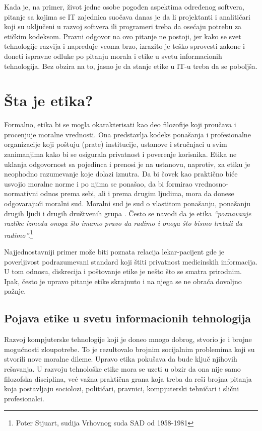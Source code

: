 \documentclass[a4paper]{article}
\begin{document}
{Kada je, na primer, život jedne osobe pogođen aspektima određenog softvera, pitanje sa kojima se IT zajednica suočava danas je da li projektanti i analitičari koji su uključeni u razvoj softvera ili programeri treba da osećaju potrebu za etičkim kodeksom.
Pravni odgovor na ovo pitanje ne postoji, jer kako se svet tehnologije razvija i napreduje veoma brzo, izrazito je teško sprovesti zakone i doneti ispravne odluke po pitanju morala i etike u svetu informacionih tehnologija. Bez obzira na to, jasno je da stanje etike u IT-u treba da se poboljša.

\section{Šta je etika?}

Formalno, etika bi se mogla okarakterisati kao deo filozofije koji pro\-u\-ča\-va i procenjuje moralne vrednosti. Ona predstavlja kodeks ponašanja i profesionalne organizacije koji poštuju (prate) institucije, ustanove i stručnjaci u svim zanimanjima kako bi se osigurala privatnost i poverenje korisnika. Etika ne uklanja odgovornost sa pojedinca i prenosi je na ustanovu, naprotiv, za etiku je neophodno razumevanje koje dolazi iznutra. Da bi čovek kao praktično biće usvojio moralne norme i po njima se ponašao, da bi formirao vrednosno-normativni odnos prema sebi, ali i prema drugim ljudima, mora da donese odgovarajući moralni sud. Moralni sud je sud o vlastitom ponašanju, ponašanju drugih ljudi i drugih društvenih grupa \cite{Tavani}\cite{Illinois}.
Često se navodi da je etika \emph{“poznavanje razlike između onoga što imamo pravo da radimo i onoga što bismo trebali da radimo”.}\footnote{Poter Stjuart, sudija Vrhovnog suda SAD od 1958-1981}

Najjednostavniji primer može biti poznata relacija lekar-pacijent gde je poverljivost podrazumevani standard koji štiti privatnost medicinskih informacija. U tom odnosu, diskrecija i poštovanje etike je nešto što se smatra prirodnim. Ipak, često je upravo pitanje etike skrajnuto i na njega se ne obraća dovoljno pažnje.

\subsection{Pojava etike u svetu informacionih tehnologija}

Razvoj kompjuterske tehnologije koji je doneo mnogo dobrog, stvorio je i brojne mogućnosti zloupotrebe. To je rezultovalo brojnim socijalnim problemima koji su stvorili nove moralne dileme. Upravo  etika pokušava da bude ključ njihovih rešavanja. U razvoju tehnološke etike mora se uzeti u obzir da ona nije samo filozofska disciplina, već važna praktična grana koja treba da reši brojna pitanja koja postavljaju sociolozi, političari, pravnici, kompjuterski tehničari i slični profesionalci\cite{Illinois}.

}
\end{document}
